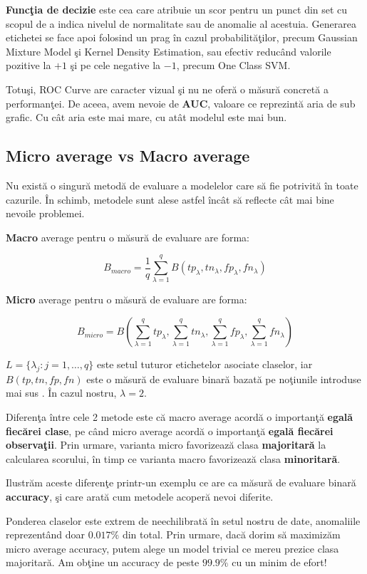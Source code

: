 \textbf{Funcţia de decizie} este cea care atribuie un scor pentru 
un punct din set cu scopul de a indica nivelul de normalitate sau de anomalie 
al acestuia. Generarea etichetei se face apoi folosind un prag în cazul 
probabilităţilor, precum Gaussian Mixture Model şi Kernel Density Estimation, 
sau efectiv reducând valorile pozitive la $+1$ şi pe cele negative la $-1$,
precum One Class SVM.

Totuşi, ROC Curve are caracter vizual şi nu ne oferă o măsură concretă a performanţei.
De aceea, avem nevoie de \textbf{AUC}, valoare ce reprezintă aria de sub grafic. Cu cât aria
este mai mare, cu atât modelul este mai bun.

\subsection{Micro average vs Macro average}

Nu există o singură metodă de evaluare a modelelor care să fie potrivită în toate 
cazurile. În schimb, metodele sunt alese astfel încât să reflecte cât mai bine 
nevoile problemei.

\textbf{Macro} average pentru o măsură de evaluare are forma:

$$B_{macro}=\frac{1}{q} \sum_{\lambda=1}^{q} B(tp_{\lambda}, tn_{\lambda}, fp_{\lambda},
fn_{\lambda})$$

\textbf{Micro} average pentru o măsură de evaluare are forma:

$$B_{micro}=B(\sum_{\lambda=1}^{q} tp_{\lambda}, \sum_{\lambda=1}^{q} tn_{\lambda}, 
\sum_{\lambda=1}^{q} fp_{\lambda}, \sum_{\lambda=1}^{q} fn_{\lambda})$$

$L=\{\lambda_{j}: j=1,\dots,q \}$ este setul tuturor etichetelor asociate claselor, iar 
$B(tp, tn, fp, fn)$ este o măsură de evaluare binară bazată pe noţiunile introduse mai sus
\cite{Asch2013MacroandME}.
În cazul nostru, $\lambda=2$.


Diferenţa între cele 2 metode este că macro average acordă o importanţă 
\textbf{egală fiecărei 
clase}, pe când micro average acordă o importanţă 
\textbf{egală fiecărei observaţii}. Prin urmare,
varianta micro favorizează clasa 
\textbf{majoritară} la calcularea scorului, în timp ce varianta 
macro favorizează clasa \textbf{minoritară}.

Ilustrăm aceste diferenţe printr-un exemplu ce are ca măsură de evaluare binară 
\textbf{accuracy},
şi care arată cum metodele acoperă nevoi diferite.

Ponderea claselor este extrem de neechilibrată în setul nostru de date, anomaliile 
reprezentând doar $0.017\%$ din total. Prin urmare, dacă dorim să maximizăm 
micro average accuracy, putem alege un model trivial ce mereu prezice clasa majoritară.
Am obţine un accuracy de peste $99.9\%$ cu un minim de efort!


